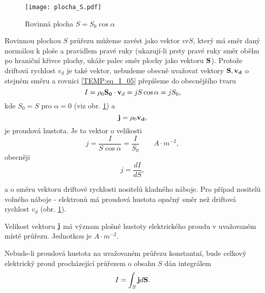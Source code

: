      \begin{figure}
        \centering
        \texttt{[image: plocha\_S.pdf]}
        \caption[Rovinná plocha $S$.]{Rovinná plocha $S = S_0\cos\alpha$}
        \label{TEMP:fig_plocha_S}
      \end{figure}           
      Rovinnou plochou $S$ průřezu můžeme zavést jako vektor $vr{S}$, který má směr daný normálou k
      ploše a pravidlem pravé ruky (ukazují-li prsty pravé ruky směr oběhu po hraniční křivce
      plochy, ukáže palec směr plochy jako vektoru $\mathbf{S}$). Protože driftová rychlost $v_d$ je
      také vektor, nebudeme obecně uvažovat vektory $\mathbf{S}, \mathbf{v_d}$ o stejném směru a rovnici
      \ref{TEMP:eq_I_05} přepíšeme do obecnějšího tvaru               
        \begin{equation}\label{TEMP:eq_I_06}
          I = \rho_0 \mathbf{S_0}\cdot\mathbf{v}_d = jS\cos\alpha = jS_0, 
        \end{equation}      
      kde $S_0 = S$ pro $\alpha = 0$ (viz obr. \ref{TEMP:fig_plocha_S}) a   
        \begin{equation}\label{TEMP:eq_I_07}
          \mathbf{j} = \rho_0\mathbf{v_d}, 
        \end{equation}        
      je proudová hustota. Je to vektor o velikosti 
        \begin{equation}\label{TEMP:eq_I_08}
          j = \frac{I}{S\cos\alpha} = \frac{I}{S_0}  \qquad A\cdot m^{-2}, 
        \end{equation}   
      obecněji
        \begin{equation}\label{TEMP:eq_I_09}
          j = \frac{dI}{dS}, 
        \end{equation}

      a o směru vektoru driftové rychlosti nositelů kladného náboje. Pro případ nositelů volného
      náboje - elektronů má proudová hustota opačný směr než driftová rychlost $v_d$ (obr.
      \ref{TEMP:fig_plocha_S}).
      
      Velikost vektoru $\mathbf{j}$ má význam plošné hustoty elektrického proudu v uvažovaném místě
      průřezu. Jednotkou je $A\cdot m^{-2}$.
      
      Nebude-li proudová hustota na uvažovaném průřezu konstantní, bude celkový elektrický proud
      procházející průřezem o obsahu $S$ dán integrálem 
        \begin{equation}\label{TEMP:eq_I_10}
          I = \int_S \mathbf{j}d\mathbf{S}. 
        \end{equation} 
     
